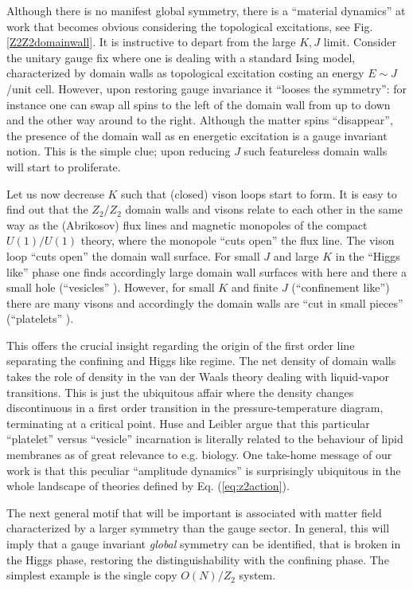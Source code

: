Although there is no manifest global symmetry, there is a ``material dynamics'' at work that becomes obvious considering the topological excitations, see Fig. \ref{Z2Z2domainwall}.  It is instructive to depart from the large $K,J$ limit. Consider the unitary gauge fix where one is dealing with a standard Ising model, characterized by domain walls as topological excitation costing an energy  $E \sim J$/unit cell. However, upon restoring gauge invariance it ``looses the symmetry'': for instance one can swap all spins to the left of the domain wall from up to down and the other way around to the right. Although the matter spins ``disappear'', the presence of the domain wall as en energetic excitation is a gauge invariant notion. This is the simple clue; upon reducing $J$ such featureless domain walls will start to proliferate.  

Let us now decrease $K$ such that (closed) vison loops start to form. It is easy to find out that the $Z_2/Z_2$ domain walls and visons relate to each other in the same way as the (Abrikosov) flux lines and magnetic monopoles of the compact $U(1)/U(1)$ theory, where the monopole ``cuts open'' the flux line. The vison loop ``cuts open'' the domain wall surface. For small $J$ and large $K$  in the ``Higgs like'' phase one finds accordingly large domain wall surfaces  with here and there a small hole (``vesicles'' \cite{HuseLeibler} ). However, for small $K$ and finite $J$ (``confinement like'') there are many visons  and accordingly the domain walls are ``cut in small pieces'' (``platelets''  \cite{HuseLeibler}).  

This offers the crucial insight regarding the origin of the first order line separating the confining and Higgs like regime. The net density of domain walls takes the role of density in the van der Waals theory dealing with liquid-vapor transitions. This is just the ubiquitous affair where the density changes discontinuous in a first order transition in the pressure-temperature diagram, terminating at a critical point. Huse and Leibler argue that this particular ``platelet'' versus ``vesicle'' incarnation is literally related to the behaviour of lipid membranes as of great relevance to e.g. biology\cite{HuseLeibler}. One take-home message of our work is that this peculiar ``amplitude dynamics'' is surprisingly ubiquitous in the whole landscape of theories defined by Eq. (\ref{eq:z2action}). 

The next general motif that will be important is associated with matter field characterized by a larger symmetry than the gauge sector. In general, this will imply that a gauge invariant {\em global} symmetry can be identified, that is broken in the Higgs phase, restoring the distinguishability with the confining phase. The simplest example is the single copy $O(N)/Z_2$ system. 

